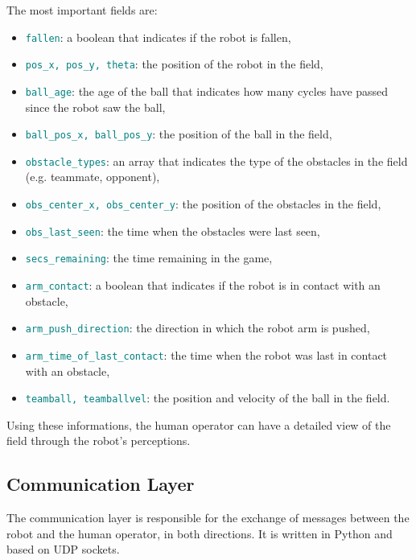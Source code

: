 \documentclass[a4paper, onecolumn, 12pt]{article}
\newcommand\code[1]{\textcolor{teal}{\texttt{#1}}}
\begin{document}
The most important fields are:
\begin{itemize}
    \item \code{fallen}: a boolean that indicates if the robot is fallen,
    \item \code{pos\_x, pos\_y, theta}: the position of the robot in the field,
    \item \code{ball\_age}: the age of the ball that indicates how many cycles have passed since the robot saw the ball,
    \item \code{ball\_pos\_x, ball\_pos\_y}: the position of the ball in the field,
    \item \code{obstacle\_types}: an array that indicates the type of the obstacles in the field (e.g. teammate, opponent),
    \item \code{obs\_center\_x, obs\_center\_y}: the position of the obstacles in the field,
    \item \code{obs\_last\_seen}: the time when the obstacles were last seen,
    \item \code{secs\_remaining}: the time remaining in the game,
    \item \code{arm\_contact}: a boolean that indicates if the robot is in contact with an obstacle,
    \item \code{arm\_push\_direction}: the direction in which the robot arm is pushed,
    \item \code{arm\_time\_of\_last\_contact}: the time when the robot was last in contact with an obstacle,
    \item \code{teamball, teamballvel}: the position and velocity of the ball in the field.
\end{itemize}
Using these informations, the human operator can have a detailed view of the field through the robot's perceptions.

\subsection{Communication Layer}

The communication layer is responsible for the exchange of messages between the
robot and the human operator, in both directions. 
It is written in Python and based on UDP sockets. 
\end{document}
